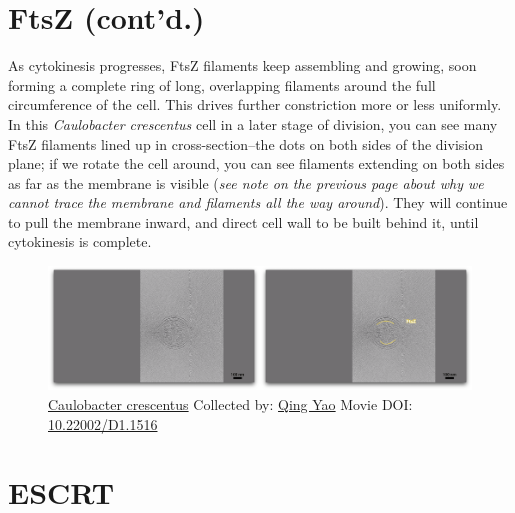 \documentclass[]{tufte-book}
\begin{document}
\section{FtsZ (cont'd.)}\label{ftsz-contd.}

As cytokinesis progresses, FtsZ filaments keep assembling and growing,
soon forming a complete ring of long, overlapping filaments around the
full circumference of the cell. This drives further constriction more or
less uniformly. In this \emph{Caulobacter crescentus} cell in a later
stage of division, you can see many FtsZ filaments lined up in
cross-section--the dots on both sides of the division plane; if we
rotate the cell around, you can see filaments extending on both sides as
far as the membrane is visible (\emph{see note on the previous page
about why we cannot trace the membrane and filaments all the way
around}). They will continue to pull the membrane inward, and direct
cell wall to be built behind it, until cytokinesis is complete.





\begin{figure}
\includegraphics{movie_stills/5_10} \caption[\protect\hyperlink{tree}{Caulobacter crescentus} Collected
by: \protect\hyperlink{qing_yao}{Qing Yao} Movie DOI:
\href{https://doi.org/10.22002/D1.1516}{10.22002/D1.1516}]{\protect\hyperlink{tree}{Caulobacter crescentus} Collected
by: \protect\hyperlink{qing_yao}{Qing Yao} Movie DOI:
\href{https://doi.org/10.22002/D1.1516}{10.22002/D1.1516}}\label{fig:5-10}
\end{figure}

\section{ESCRT}\label{escrt}
\end{document}
